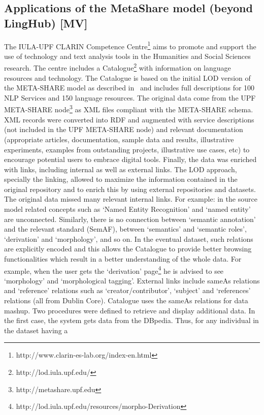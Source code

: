 \documentclass{llncs}
\begin{document}
{\subsection{Applications of the MetaShare model (beyond LingHub) [MV]}
\label{sec:applications}
The IULA-UPF CLARIN Competence Centre\footnote{http://www.clarin-es-lab.org/index-en.html} aims to promote and support the use of technology and text analysis tools in the Humanities and Social Sciences research. The centre includes a Catalogue\footnote{http://lod.iula.upf.edu/} with information on language resources and technology.
The Catalogue is based on the initial LOD version of the META-SHARE model as described in~\cite{Villegas2014} and includes full descriptions for 100 NLP Services and 150 language resources. The original data come from the UPF META-SHARE node\footnote{http://metashare.upf.edu} as XML files compliant with the META-SHARE schema. XML records were converted into RDF and augmented with service descriptions (not included in the UPF META-SHARE node) and relevant documentation (appropriate articles, documentation, sample data and results, illustrative experiments, examples from outstanding projects, illustrative use cases, etc) to encourage potential users to embrace digital tools. Finally, the data was enriched with links, including internal as well as external links.
The LOD approach, specially the linking, allowed to maximize the information
contained in the original repository and to enrich this by using external
repositories and datasets. The original data missed many relevant internal
links. For example: in the source model related concepts such as `Named Entity
Recognition' and `named entity' are unconnected. Similarly, there is no
connection between `semantic annotation' and the relevant standard (SemAF),
between `semantics' and `semantic roles', `derivation' and `morphology', and so
on. In the eventual dataset, such relations are explicitly encoded and this
allows the Catalogue to provide better browsing functionalities which result in
a better understanding of the whole data. For example, when the user gets the
`derivation' page\footnote{http://lod.iula.upf.edu/resources/morpho-Derivation}
he is advised to see `morphology' and `morphological tagging'.
External links include sameAs relations and `reference' relations such as
`creator/contributor', `subject' and `references' relations (all from Dublin
Core). Catalogue uses the sameAs relations for data mashup. Two procedures were
defined to retrieve and display additional data. In the first case, the system
gets data from the DBpedia. Thus, for any individual in the dataset having a
}
\end{document}

